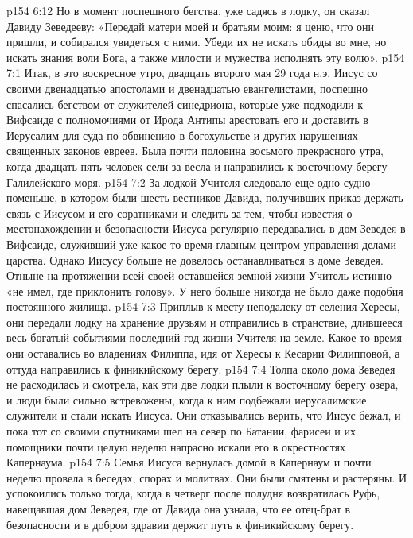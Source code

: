 \vs p154 6:12 Но в момент поспешного бегства, уже садясь в лодку, он сказал Давиду Зеведееву: «Передай матери моей и братьям моим: я ценю, что они пришли, и собирался увидеться с ними. Убеди их не искать обиды во мне, но искать знания воли Бога, а также милости и мужества исполнять эту волю».
\vs p154 7:1 Итак, в это воскресное утро, двадцать второго мая 29 года н.э. Иисус со своими двенадцатью апостолами и двенадцатью евангелистами, поспешно спасались бегством от служителей синедриона, которые уже подходили к Вифсаиде с полномочиями от Ирода Антипы арестовать его и доставить в Иерусалим для суда по обвинению в богохульстве и других нарушениях священных законов евреев. Была почти половина восьмого прекрасного утра, когда двадцать пять человек сели за весла и направились к восточному берегу Галилейского моря.
\vs p154 7:2 За лодкой Учителя следовало еще одно судно поменьше, в котором были шесть вестников Давида, получивших приказ держать связь с Иисусом и его соратниками и следить за тем, чтобы известия о местонахождении и безопасности Иисуса регулярно передавались в дом Зеведея в Вифсаиде, служивший уже какое\hyp{}то время главным центром управления делами царства. Однако Иисусу больше не довелось останавливаться в доме Зеведея. Отныне на протяжении всей своей оставшейся земной жизни Учитель истинно «не имел, где приклонить голову». У него больше никогда не было даже подобия постоянного жилища.
\vs p154 7:3 Приплыв к месту неподалеку от селения Хересы, они передали лодку на хранение друзьям и отправились в странствие, длившееся весь богатый событиями последний год жизни Учителя на земле. Какое\hyp{}то время они оставались во владениях Филиппа, идя от Хересы к Кесарии Филипповой, а оттуда направились к финикийскому берегу.
\vs p154 7:4 \pc Толпа около дома Зеведея не расходилась и смотрела, как эти две лодки плыли к восточному берегу озера, и люди были сильно встревожены, когда к ним подбежали иерусалимские служители и стали искать Иисуса. Они отказывались верить, что Иисус бежал, и пока тот со своими спутниками шел на север по Батании, фарисеи и их помощники почти целую неделю напрасно искали его в окрестностях Капернаума.
\vs p154 7:5 Семья Иисуса вернулась домой в Капернаум и почти неделю провела в беседах, спорах и молитвах. Они были смятены и растеряны. И успокоились только тогда, когда в четверг после полудня возвратилась Руфь, навещавшая дом Зеведея, где от Давида она узнала, что ее отец\hyp{}брат в безопасности и в добром здравии держит путь к финикийскому берегу.
